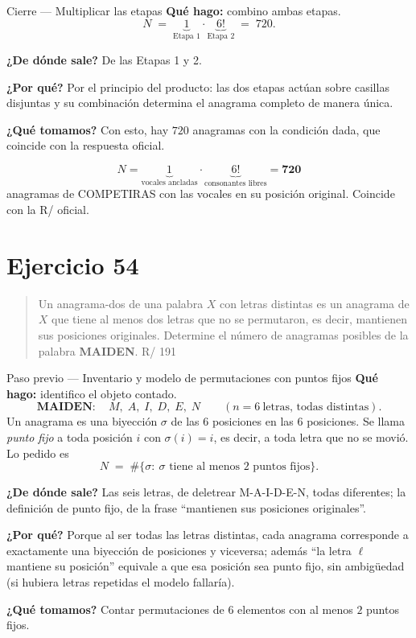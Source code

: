 \documentclass[11pt]{article}
\begin{document}
\begin{paso}{Cierre --- Multiplicar las etapas}
\textbf{Qu\'e hago:} combino ambas etapas.
\[
N\;=\;\underbrace{1}_{\text{Etapa 1}}\cdot\underbrace{6!}_{\text{Etapa 2}}\;=\;720 .
\]

\textbf{¿De d\'onde sale?} De las Etapas 1 y 2.

\textbf{¿Por qu\'e?} Por el principio del producto: las dos etapas act\'uan sobre casillas disjuntas y su
combinaci\'on determina el anagrama completo de manera \'unica.

\textbf{¿Qu\'e tomamos?} Con esto, hay $720$ anagramas con la condici\'on dada, que coincide con la
respuesta oficial.
\end{paso}

\begin{resp}
\[
N=\underbrace{1}_{\text{vocales ancladas}}\cdot\underbrace{6!}_{\text{consonantes libres}}=\mathbf{720}
\]
anagramas de COMPETIRAS con las vocales en su posici\'on original. Coincide con la R/ oficial.
\end{resp}

\section*{Ejercicio 54}

\begin{quote}
Un anagrama-dos de una palabra $X$ con letras distintas es un anagrama de $X$ que tiene al menos dos letras
que no se permutaron, es decir, mantienen sus posiciones originales. Determine el n\'umero de anagramas
posibles de la palabra \textbf{MAIDEN}. \hfill R/ 191
\end{quote}

\begin{paso}{Paso previo --- Inventario y modelo de permutaciones con puntos fijos}
\textbf{Qu\'e hago:} identifico el objeto contado.
\[
\textbf{MAIDEN}:\quad M,\;A,\;I,\;D,\;E,\;N \qquad (n=6\ \text{letras, todas distintas}) .
\]
Un anagrama es una biyecci\'on $\sigma$ de las $6$ posiciones en las $6$ posiciones. Se llama \emph{punto
fijo} a toda posici\'on $i$ con $\sigma(i)=i$, es decir, a toda letra que no se movi\'o. Lo pedido es
\[
N\;=\;\#\{\sigma:\ \sigma \text{ tiene al menos } 2 \text{ puntos fijos}\} .
\]

\textbf{¿De d\'onde sale?} Las seis letras, de deletrear M-A-I-D-E-N, todas diferentes; la definici\'on de
punto fijo, de la frase ``mantienen sus posiciones originales''.

\textbf{¿Por qu\'e?} Porque al ser todas las letras distintas, cada anagrama corresponde a exactamente una
biyecci\'on de posiciones y viceversa; adem\'as ``la letra $\ell$ mantiene su posici\'on'' equivale a que esa
posici\'on sea punto fijo, sin ambig\"uedad (si hubiera letras repetidas el modelo fallar\'ia).

\textbf{¿Qu\'e tomamos?} Contar permutaciones de $6$ elementos con al menos $2$ puntos fijos.
\end{paso}
\end{document}
